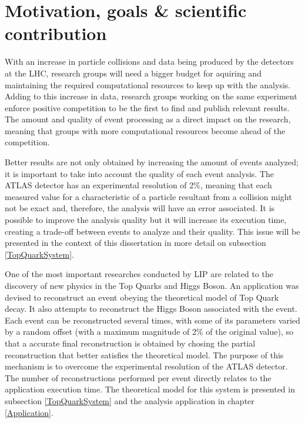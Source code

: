 \section{Motivation, goals \& scientific contribution}
\label{Motivation}

With an increase in particle collisions and data being produced by the detectors at the LHC, research groups will need a bigger budget for aquiring and maintaining the required computational resources to keep up with the analysis. Adding to this increase in data, research groups working on the same experiment enforce positive competition to be the first to find and publish relevant results. The amount and quality of event processing as a direct impact on the research, meaning that groups with more computational resources become ahead of the competition.

Better results are not only obtained by increasing the amount of events analyzed; it is important to take into account the quality of each event analysis. The ATLAS detector has an experimental resolution of 2\%, meaning that each measured value for a characteristic of a particle resultant from a collision might not be exact and, therefore, the analysis will have an error associated. It is possible to improve the analysis quality but it will increase its execution time, creating a trade-off between events to analyze and their quality. This issue will be presented in the context of this dissertation in more detail on subsection \ref{TopQuarkSystem}.

One of the most important researches conducted by LIP are related to the discovery of new physics in the Top Quarks and Higgs Boson. An application was devised to reconstruct an event obeying the theoretical model of Top Quark decay. It also attempts to reconstruct the Higgs Boson associated with the event. Each event can be reconstructed several times, with some of its parameters varied by a random offset (with a maximum magnitude of 2\% of the original value), so that a accurate final reconstruction is obtained by chosing the partial reconstruction that better satisfies the theoretical model. The purpose of this mechanism is to overcome the experimental resolution of the ATLAS detector. The number of reconstructions performed per event directly relates to the application execution time. The theoretical model for this system is presented in subsection \ref{TopQuarkSystem} and the analysis application in chapter \ref{Application}.

